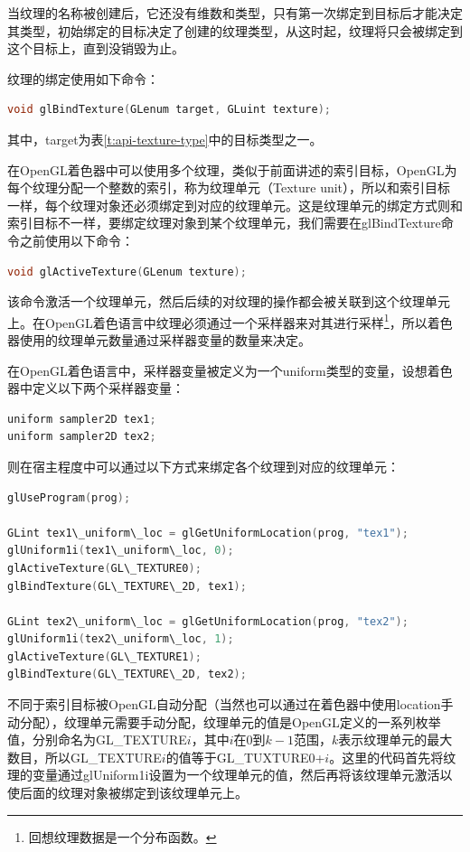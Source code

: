 当纹理的名称被创建后，它还没有维数和类型，只有第一次绑定到目标后才能决定其类型，初始绑定的目标决定了创建的纹理类型，从这时起，纹理将只会被绑定到这个目标上，直到没销毁为止。

纹理的绑定使用如下命令：

\begin{lstlisting}[language=C++]
void glBindTexture(GLenum target, GLuint texture);
\end{lstlisting}

其中，target为表\ref{t:api-texture-type}中的目标类型之一。

在OpenGL着色器中可以使用多个纹理，类似于前面讲述的索引目标，OpenGL为每个纹理分配一个整数的索引，称为纹理单元（Texture unit），所以和索引目标一样，每个纹理对象还必须绑定到对应的纹理单元。这是纹理单元的绑定方式则和索引目标不一样，要绑定纹理对象到某个纹理单元，我们需要在glBindTexture命令之前使用以下命令：

\begin{lstlisting}[language=C++]
void glActiveTexture(GLenum texture);
\end{lstlisting}

该命令激活一个纹理单元，然后后续的对纹理的操作都会被关联到这个纹理单元上。在OpenGL着色语言中纹理必须通过一个采样器来对其进行采样\footnote{回想纹理数据是一个分布函数。}，所以着色器使用的纹理单元数量通过采样器变量的数量来决定。

在OpenGL着色语言中，采样器变量被定义为一个uniform类型的变量，设想着色器中定义以下两个采样器变量：

\begin{lstlisting}[language=C++]
uniform sampler2D tex1;
uniform sampler2D tex2;
\end{lstlisting}

则在宿主程度中可以通过以下方式来绑定各个纹理到对应的纹理单元：

\begin{lstlisting}[language=C++]
glUseProgram(prog);

GLint tex1\_uniform\_loc = glGetUniformLocation(prog, "tex1");
glUniform1i(tex1\_uniform\_loc, 0);
glActiveTexture(GL\_TEXTURE0);
glBindTexture(GL\_TEXTURE\_2D, tex1);
 	
GLint tex2\_uniform\_loc = glGetUniformLocation(prog, "tex2");
glUniform1i(tex2\_uniform\_loc, 1);
glActiveTexture(GL\_TEXTURE1);
glBindTexture(GL\_TEXTURE\_2D, tex2);
\end{lstlisting}

不同于索引目标被OpenGL自动分配（当然也可以通过在着色器中使用location手动分配），纹理单元需要手动分配，纹理单元的值是OpenGL定义的一系列枚举值，分别命名为GL\_TEXTURE$i$，其中$i$在0到$k-1$范围，$k$表示纹理单元的最大数目，所以GL\_TEXTURE$i$的值等于GL\_TUXTURE0+$i$。这里的代码首先将纹理的变量通过glUniform1i设置为一个纹理单元的值，然后再将该纹理单元激活以使后面的纹理对象被绑定到该纹理单元上。

